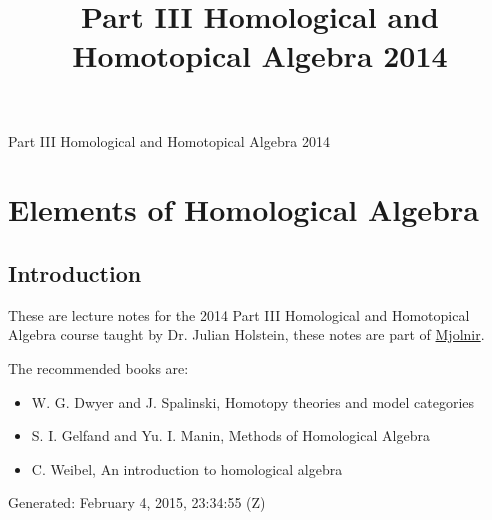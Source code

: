 \documentclass[10pt,]{book}
\title{Part III Homological and Homotopical Algebra 2014}
\author{}
\date{}
\theoremstyle{plain}
\theoremstyle{definition}
\numberwithin{equation}{section}
\begin{document}
\frontmatter
\thispagestyle{empty}
\begin{center}
{\Huge Part III Homological and Homotopical Algebra 2014}
\end{center}\par
{}
\clearpage
\thispagestyle{empty}
\clearpage
\maketitle
\clearpage
\thispagestyle{empty}
\clearpage
\setcounter{tocdepth}{1}
\renewcommand*\contentsname{Contents}
\tableofcontents
\mainmatter
\typeout{************************************************}
\typeout{************************************************}
\chapter[Elements of Homological Algebra]{Elements of Homological Algebra}\label{chap-hom-alg}
\typeout{************************************************}
\typeout{************************************************}
\section[Introduction]{Introduction}\label{sec-introduction}
These are lecture notes for the 2014 Part III Homological and Homotopical Algebra course taught by Dr. Julian Holstein, these notes are part of \href{https://alexjbest.github.io/mjolnir/}{Mjolnir}.%
\par
The recommended books are: 
          \begin{itemize}
\item{}W. G. Dwyer and J. Spalinski, Homotopy theories and model categories\item{}S. I. Gelfand and Yu. I. Manin, Methods of Homological Algebra\item{}C. Weibel, An introduction to homological algebra\end{itemize}

\par

          Generated: February 4, 2015, 23:34:55 (Z)
\typeout{************************************************}
\typeout{************************************************}
\end{document}
